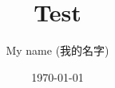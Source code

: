 \documentclass{beamer}
\begin{document}
\title{Test}
\author{My name (我的名字)}
\date{\today}

\begin{frame}
    \titlepage
\end{frame}
\end{document}
